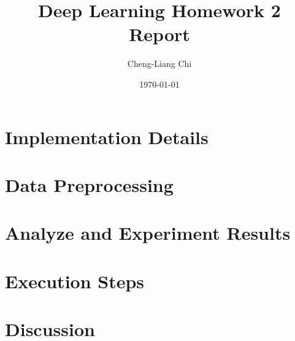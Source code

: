 \documentclass[12pt,a4paper]{article}
\title{Deep Learning Homework 2 Report}
\author{Cheng-Liang Chi}
\date{\today}
\begin{document}
\maketitle
\tableofcontents
\newpage



\section{Implementation Details}


\section{Data Preprocessing}


\section{Analyze and Experiment Results}


\section{Execution Steps}


\section{Discussion}


\printbibliography
\end{document}
